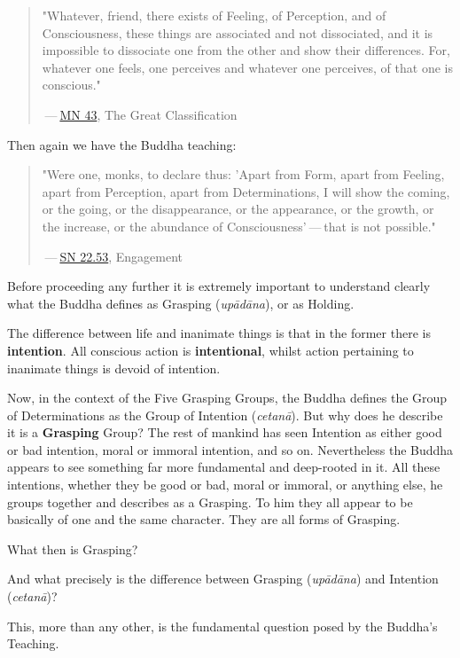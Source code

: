\begin{quote}
"Whatever, friend, there exists of Feeling, of Perception, and of Consciousness, these things are associated and not dissociated, and it is impossible to dissociate one from the other and show their differences. For, whatever one feels, one perceives and whatever one perceives, of that one is conscious."

 --- \href{https://suttacentral.net/mn43/en/sujato}{MN 43}, The Great Classification
\end{quote}

Then again we have the Buddha teaching:

\begin{quote}
"Were one, monks, to declare thus: 'Apart from Form, apart from Feeling, apart from Perception, apart from Determinations, I will show the coming, or the going, or the disappearance, or the appearance, or the growth, or the increase, or the abundance of Consciousness' --- that is not possible."

 --- \href{https://suttacentral.net/sn22.53/en/bodhi}{SN 22.53}, Engagement
\end{quote}

Before proceeding any further it is extremely important to understand clearly what the Buddha defines as Grasping (\emph{upādāna}), or as Holding.

The difference between life and inanimate things is that in the former there is \textbf{intention}. All conscious action is \textbf{intentional}, whilst action pertaining to inanimate things is devoid of intention.

Now, in the context of the Five Grasping Groups, the Buddha defines the Group of Determinations as the Group of Intention (\emph{cetanā}). But why does he describe it is a \textbf{Grasping} Group? The rest of mankind has seen Intention as either good or bad intention, moral or immoral intention, and so on. Nevertheless the Buddha appears to see something far more fundamental and deep-rooted in it. All these intentions, whether they be good or bad, moral or immoral, or anything else, he groups together and describes as a Grasping. To him they all appear to be basically of one and the same character. They are all forms of Grasping.

What then is Grasping?

And what precisely is the difference between Grasping (\emph{upādāna}) and Intention (\emph{cetanā})?

This, more than any other, is the fundamental question posed by the Buddha's Teaching.

